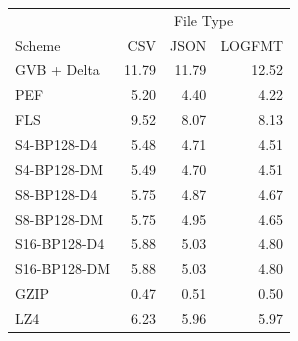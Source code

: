 \begin{tabular}{lrrr}
\toprule
 & \multicolumn{3}{c}{File Type} \\
Scheme & CSV & JSON & LOGFMT \\
\midrule
GVB + Delta & 11.79 & 11.79 & 12.52 \\
PEF & 5.20 & 4.40 & 4.22 \\
FLS & 9.52 & 8.07 & 8.13 \\
S4-BP128-D4 & 5.48 & 4.71 & 4.51 \\
S4-BP128-DM & 5.49 & 4.70 & 4.51 \\
S8-BP128-D4 & 5.75 & 4.87 & 4.67 \\
S8-BP128-DM & 5.75 & 4.95 & 4.65 \\
S16-BP128-D4 & 5.88 & 5.03 & 4.80 \\
S16-BP128-DM & 5.88 & 5.03 & 4.80 \\
GZIP & 0.47 & 0.51 & 0.50 \\
LZ4 & 6.23 & 5.96 & 5.97 \\
\bottomrule
\end{tabular}

